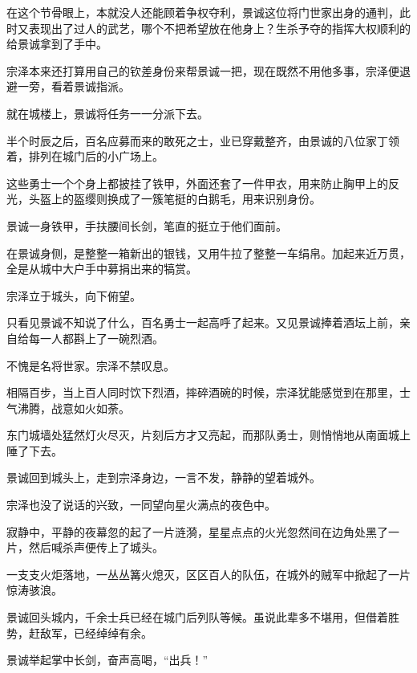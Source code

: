 在这个节骨眼上，本就没人还能顾着争权夺利，景诚这位将门世家出身的通判，此时又表现出了过人的武艺，哪个不把希望放在他身上？生杀予夺的指挥大权顺利的给景诚拿到了手中。

宗泽本来还打算用自己的钦差身份来帮景诚一把，现在既然不用他多事，宗泽便退避一旁，看着景诚指派。

就在城楼上，景诚将任务一一分派下去。

半个时辰之后，百名应募而来的敢死之士，业已穿戴整齐，由景诚的八位家丁领着，排列在城门后的小广场上。

这些勇士一个个身上都披挂了铁甲，外面还套了一件甲衣，用来防止胸甲上的反光，头盔上的盔缨则换成了一簇笔挺的白鹅毛，用来识别身份。

景诚一身铁甲，手扶腰间长剑，笔直的挺立于他们面前。

在景诚身侧，是整整一箱新出的银钱，又用牛拉了整整一车绢帛。加起来近万贯，全是从城中大户手中募捐出来的犒赏。

宗泽立于城头，向下俯望。

只看见景诚不知说了什么，百名勇士一起高呼了起来。又见景诚捧着酒坛上前，亲自给每一人都斟上了一碗烈酒。

不愧是名将世家。宗泽不禁叹息。

相隔百步，当上百人同时饮下烈酒，摔碎酒碗的时候，宗泽犹能感觉到在那里，士气沸腾，战意如火如荼。

东门城墙处猛然灯火尽灭，片刻后方才又亮起，而那队勇士，则悄悄地从南面城上陲了下去。

景诚回到城头上，走到宗泽身边，一言不发，静静的望着城外。

宗泽也没了说话的兴致，一同望向星火满点的夜色中。

寂静中，平静的夜幕忽的起了一片涟漪，星星点点的火光忽然间在边角处黑了一片，然后喊杀声便传上了城头。

一支支火炬落地，一丛丛篝火熄灭，区区百人的队伍，在城外的贼军中掀起了一片惊涛骇浪。

景诚回头城内，千余士兵已经在城门后列队等候。虽说此辈多不堪用，但借着胜势，赶敌军，已经绰绰有余。

景诚举起掌中长剑，奋声高喝，“出兵！”
